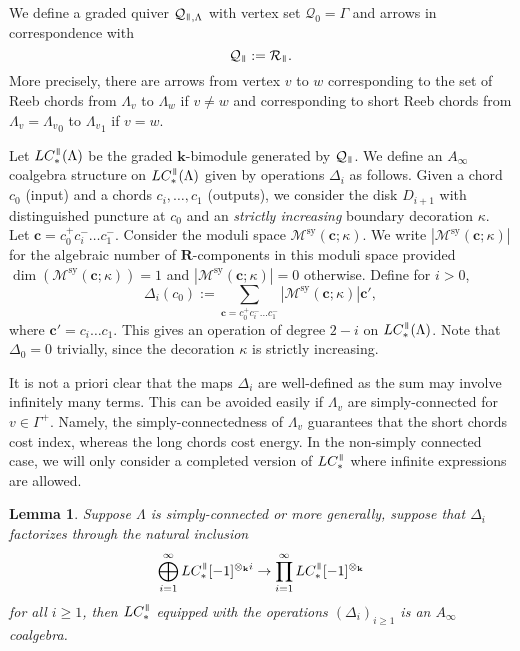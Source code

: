\documentclass{gtpart}
\newtheorem{lem}[thm]{Lemma}
\renewcommand{\k}{\mathbf{k}}
\renewcommand{\R}{\mathbf{R}}
\newcommand{\sy}{\mathrm{sy}}
\renewcommand{\parallel}{{\mkern3mu\vphantom{\perp}\vrule depth 0pt\mkern2mu\vrule depth
0pt\mkern3mu}}
\begin{document}
We define a graded quiver $\mathcal{Q}_{\parallel,\Lambda}$ with vertex set $\mathcal{Q}_0 = \Gamma$ and arrows in correspondence with
\[ \mathcal{Q}_{\parallel} := \mathcal{R}_{\parallel}. \] 
More precisely, there are arrows from vertex $v$ to $w$ corresponding to the set of Reeb chords from
$\Lambda_v$ to $\Lambda_w$ if $v\ne w$ and corresponding to short Reeb chords from $\Lambda_{v}={\Lambda_{v}}_{0}$ to ${\Lambda_{v}}_{1}$ if $v=w$. 
 
Let $LC_*^{\parallel}(\Lambda)$ be the graded $\k$-bimodule generated by $\mathcal{Q}_{\parallel}$. 
We define an $A_\infty$ coalgebra structure on $LC^{\parallel}_{\ast}(\Lambda)$ given by operations $\Delta_i$ as follows. Given a chord $c_0$ (input) and a chords $c_i, \ldots, c_1$ (outputs), we consider the disk $D_{i+1}$ with distinguished puncture at $c_{0}$ and an \emph{strictly increasing} boundary decoration $\kappa$. 
Let $\mathbf{c}=c_{0}^{+}c_{i}^{-}\dots c_{1}^{-}$. Consider the moduli space
$\mathcal{M}^{\sy}(\mathbf{c};\kappa)$. We write $|\mathcal{M}^{\sy}(\mathbf{c};\kappa)|$ for the
algebraic number of $\R$-components in this moduli space provided
$\dim(\mathcal{M}^{\sy}(\mathbf{c};\kappa))=1$ and $|\mathcal{M}^{\sy}(\mathbf{c};\kappa)|=0$
otherwise. Define for $i > 0$,  
\[ 
\Delta_i(c_0) := \sum_{\mathbf{c}=c_0^{+}c_i^{-}\dots c_1^{-}} |\mathcal{M}^{\sy}(\mathbf{c};\kappa)|\mathbf{c}',
\] 
where $\mathbf{c}'=c_{i}\dots c_{1}$. This gives an operation of degree $2-i$ on
$LC^{\parallel}_{*}(\Lambda)$. Note that $\Delta_0 =0$ trivially, since the decoration
$\kappa$ is strictly increasing. 

It is not a priori clear that the maps $\Delta_i$ are well-defined as the sum may involve infinitely
many terms. This can be avoided easily if $\Lambda_v$ are simply-connected for $v \in \Gamma^+$.
Namely, the simply-connectedness of $\Lambda_v$ guarantees that the short chords cost index, whereas
the long chords cost energy. In the non-simply connected case, we will only consider a completed version of $LC_{\ast}^{\parallel}$ where infinite expressions are allowed.  

\begin{lem}
    Suppose $\Lambda$ is simply-connected or more generally, suppose that $\Delta_i$
    factorizes through the natural inclusion 
    \[ \bigoplus_{i=1}^\infty LC_{\ast}^{\parallel}[-1]^{\otimes_{\k}i} \to
    \prod_{i=1}^{\infty} LC_{\ast}^{\parallel}[-1]^{\otimes_{\k}} \]
    for all $i \geq 1$,  then $LC_{\ast}^{\parallel}$ equipped with the operations
    $(\Delta_{i})_{i\geq 1}$ is an $A_\infty$
    coalgebra. 
\end{lem}
\end{document}
